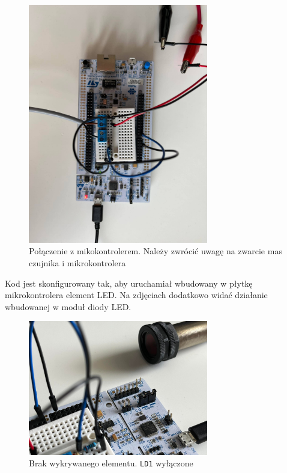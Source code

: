 \documentclass[11pt, a4paper]{article}
\begin{document}
\begin{figure}[h!]
    \centering
    \includegraphics[angle=90, width=0.7\textwidth]{fig/SCOO/pol1.jpg}
    \caption{Połączenie z mikokontrolerem. Należy zwrócić uwagę na zwarcie mas czujnika i mikrokontrolera}
\end{figure}

\newpage

Kod jest skonfigurowany tak, aby uruchamiał wbudowany w płytkę mikrokontrolera element LED. Na 
zdjęciach dodatkowo widać działanie wbudowanej w moduł diody LED. 

\begin{figure}[h!]
    \centering
    \includegraphics[angle=0, width=0.7\textwidth]{fig/SCOO/mikro-off.jpg}
    \caption{Brak wykrywanego elementu. \texttt{LD1} wyłączone}
\end{figure}
\end{document}
